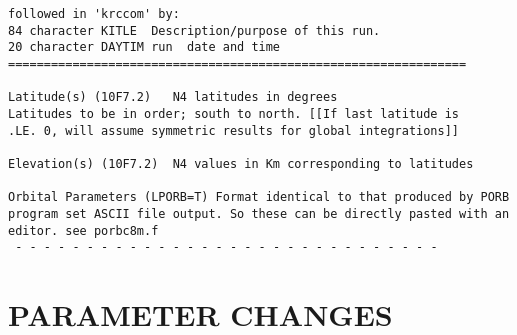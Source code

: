 \documentclass{article}
\begin{document}
\begin{verbatim}
followed in 'krccom' by: 
84 character KITLE	Description/purpose of this run.
20 character DAYTIM	run  date and time
================================================================

Latitude(s) (10F7.2)   N4 latitudes in degrees
Latitudes to be in order; south to north. [[If last latitude is
.LE. 0, will assume symmetric results for global integrations]]

Elevation(s) (10F7.2)  N4 values in Km corresponding to latitudes

Orbital Parameters (LPORB=T) Format identical to that produced by PORB
program set ASCII file output. So these can be directly pasted with an
editor. see porbc8m.f
 - - - - - - - - - - - - - - - - - - - - - - - - - - - - - - 
\end{verbatim}

\section{PARAMETER CHANGES \label{pc}}
\end{document}

